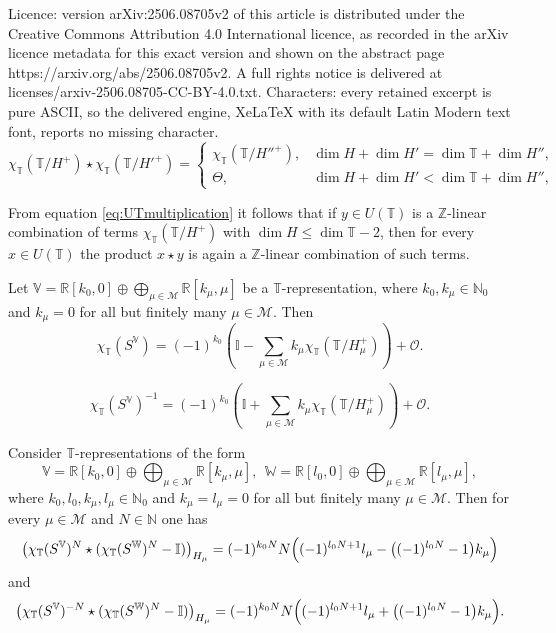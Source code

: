 \documentclass[10pt,a4paper]{amsart}
\newcommand{\bI}{\mathbb{I}}
\newcommand{\bN}{\mathbb{N}}
\newcommand{\bR}{\mathbb{R}}
\newcommand{\bT}{\mathbb{T}}
\newcommand{\bV}{\mathbb{V}}
\newcommand{\bW}{\mathbb{W}}
\newcommand{\bZ}{\mathbb{Z}}
\newcommand{\cM}{\mathcal{M}}
\newcommand{\cO}{\mathcal{O}}
\begin{document}
Licence: version arXiv:2506.08705v2 of this article is distributed under the Creative Commons Attribution 4.0 International licence, as recorded in the arXiv licence metadata for this exact version and shown on the abstract page https://arxiv.org/abs/2506.08705v2. A full rights notice is delivered at licenses/arxiv-2506.08705-CC-BY-4.0.txt. Characters: every retained excerpt is pure ASCII, so the delivered engine, XeLaTeX with its default Latin Modern text font, reports no missing character.
\begin{equation}\label{eq:UTmultiplication}
\chi_\bT(\bT/H^+)\star\chi_\bT(\bT/H'^+)=
\begin{cases}
\chi_\bT(\bT/H''^+), & \dim H+\dim H'=\dim\bT+\dim H'',\\
\Theta, & \dim H+\dim H'<\dim\bT+\dim H'',
\end{cases}
\end{equation}

\begin{Remark}\label{rem:bigcodim} From equation \eqref{eq:UTmultiplication} it follows that if $y\in U(\bT)$ is a $\bZ$-linear combination of terms $\chi_\bT(\bT/H^+)$ with $\dim H\le \dim\bT-2$, then for every $x\in U(\bT)$ the product $x\star y$ is again a $\bZ$-linear combination of such terms.
\end{Remark}

\begin{Theorem}\label{thm:UTnmult}
Let
$\bV=\bR[k_0,0]\oplus\bigoplus_{\mu\in\cM}\bR[k_\mu,\mu]$
be a $\bT$-representation, where $k_0,k_\mu\in\bN_0$ and $k_\mu=0$ for all but finitely many $\mu\in\cM$. Then
\[
\chi_\bT(S^\bV)=(-1)^{k_0}\left(\bI-\sum_{\mu\in\cM} k_\mu\chi_\bT(\bT/H_\mu^+)\right)+\cO.
\]
\end{Theorem}

\begin{equation}\label{eq:chi-inv-codim1}
\chi_\bT(S^\bV)^{-1}=(-1)^{k_0}\left(\bI+\sum_{\mu\in\cM} k_\mu\chi_\bT(\bT/H_{\mu}^+)\right)+\cO.
\end{equation}

\begin{Lemma}\label{lem:codim1-coeff}
Consider $\bT$-representations of the form
\[
\bV=\bR[k_0,0]\oplus\bigoplus_{\mu\in\cM}\bR[k_\mu,\mu],\ \
\bW=\bR[l_0,0]\oplus\bigoplus_{\mu\in\cM}\bR[l_\mu,\mu],
\]
where $k_0,l_0,k_\mu,l_\mu\in\bN_0$ and $k_\mu=l_\mu=0$ for all but finitely many $\mu\in\cM$. Then for every $\mu\in\cM$ and $N\in\bN$ one has
\begin{equation}\label{eq:codim1-product}
\bigl(\chi_\bT(S^\bV)^N\star(\chi_\bT(S^\bW)^N-\bI)\bigr)_{H_\mu}=(-1)^{k_0N}N\Bigl((-1)^{l_0N+1}l_\mu-\bigl((-1)^{l_0N}-1\bigr)k_\mu\Bigr)
\end{equation}
and
\begin{equation}\label{eq:codim1-product-inv}
\bigl(\chi_\bT(S^\bV)^{-N}\star(\chi_\bT(S^\bW)^N-\bI)\bigr)_{H_\mu}=(-1)^{k_0N}N\Bigl((-1)^{l_0N+1}l_\mu+\bigl((-1)^{l_0N}-1\bigr)k_\mu\Bigr).
\end{equation}
\end{Lemma}
\end{document}
